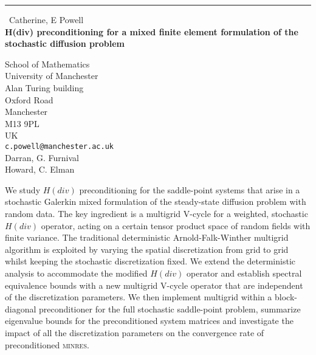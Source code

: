 \documentclass{report}
\begin{document}
\begin{center}
\rule{6in}{1pt} \
{\large Catherine, E Powell \\
{\bf H(div) preconditioning for a mixed finite element formulation of the stochastic diffusion problem}}

School of Mathematics \\ University of Manchester \\ Alan Turing building \\ Oxford Road \\ Manchester \\ M13 9PL \\ UK
\\
{\tt c.powell@manchester.ac.uk}\\
Darran, G. Furnival\\
Howard, C. Elman\end{center}

We study $H(div)$ preconditioning for the saddle-point systems that arise
in a stochastic Galerkin mixed formulation of the steady-state diffusion
problem with random data. The key ingredient is a multigrid V-cycle for a
weighted, stochastic
$H(div)$ operator, acting on a certain tensor product space of random
fields with finite variance. The traditional deterministic
Arnold-Falk-Winther multigrid algorithm is exploited by varying the
spatial discretization from grid to grid whilst keeping the stochastic
discretization fixed. We extend the deterministic analysis to accommodate
the modified $H(div)$ operator and establish spectral equivalence bounds
with a new multigrid V-cycle operator that are independent of the
discretization parameters. We then implement multigrid within a
block-diagonal preconditioner for the full stochastic saddle-point
problem, summarize eigenvalue bounds for the preconditioned system
matrices and investigate the impact of all the discretization parameters
on the convergence rate of preconditioned \textsc{minres}.
\end{document}
